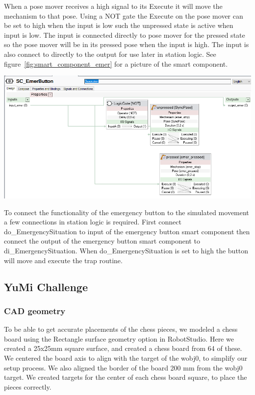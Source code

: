 \documentclass[a4paper,12pt]{article}
\begin{document}
When a pose mover receives a high signal to its Execute it will move the mechanism to that pose. Using a NOT gate the Execute on the pose mover can be set to high when the input is low such the unpressed state is active when input is low. The input is connected directly to pose mover for the pressed state so the pose mover will be in its pressed pose when the input is high. The input is also connect to directly to the output for use later in station logic. See figure~\ref{fig:smart_component_emer} for a picture of the smart component.
\begin{center}
    \includegraphics[width=0.8\linewidth]{SC_emer_button.png}
    \label{fig:smart_component_emer}
\end{center}
To connect the functionality of the emergency button to the simulated movement a few connections in station logic is required. First connect do\_EmergencySituation to input of the emergency button smart component then connect the output of the emergency button smart component to di\_EmergencySituation. When do\_EmergencySituation is set to high the button will move and execute the trap routine.

\subsection{YuMi Challenge}
\subsubsection{CAD geometry}
To be able to get accurate placements of the chess pieces, we modeled a chess board using the Rectangle surface geometry option in RobotStudio. Here we created a 25x25mm square surface, and created a chess board from 64 of these. We centered the board axis to align with the target of the wobj0, to simplify our setup process. We also aligned the border of the board 200 mm from the wobj0 target. 
We created targets for the center of each chess board square, to place the pieces correctly. 
\end{document}
